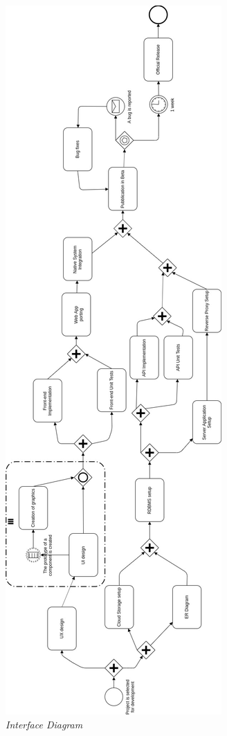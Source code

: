 \newpage
\begin{figure}[H]
  \centering
  \includegraphics[origin=c,width=\textwidth,height=.95\textheight,keepaspectratio]{DD_Images/DevelopmentBPMN.jpg}
  \caption{\textit{Interface Diagram}}
\end{figure}